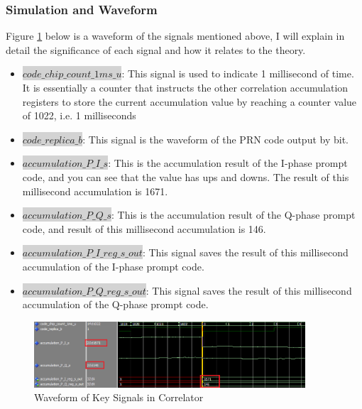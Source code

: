 
% 



\subsubsection{Simulation and Waveform}
Figure \ref{fig:correlator_wave} below is a waveform  of the signals mentioned above, I will explain in detail the significance of each signal and how it relates to the theory.

\begin{itemize}
    \item \colorbox{lightgray}{$code\_chip\_count\_1ms\_u$}: This signal is used to indicate 1 millisecond of time. It is essentially a counter that instructs the other correlation accumulation registers to store the current accumulation value by reaching a counter value of 1022, i.e. 1 milliseconds
    \item \colorbox{lightgray}{$code\_replica\_b$}:  This signal is the waveform of the PRN  code output by bit.
    \item \colorbox{lightgray}{$accumulation\_P\_I\_s$}: This is the accumulation result of the I-phase prompt code, and you can see that the value has ups and downs. The result of this millisecond accumulation is \num{1671}.
    \item \colorbox{lightgray}{$accumulation\_P\_Q\_s$}: This is the accumulation result of the Q-phase prompt code, and result of this millisecond accumulation is \num{146}.
    \item \colorbox{lightgray}{$accumulation\_P\_I\_reg\_s\_out$}: This signal saves the result of this millisecond accumulation of the I-phase prompt code.
    \item \colorbox{lightgray}{$accumulation\_P\_Q\_reg\_s\_out$}: This signal saves the result of this millisecond accumulation of the Q-phase prompt code.
\end{itemize}

\begin{figure}[!htbp]
    \centering
    \includegraphics[width=0.9\textwidth]{_IMAGES/correlator_wave.png}
    \caption{Waveform of Key Signals in Correlator}
    \label{fig:correlator_wave}
\end{figure}
